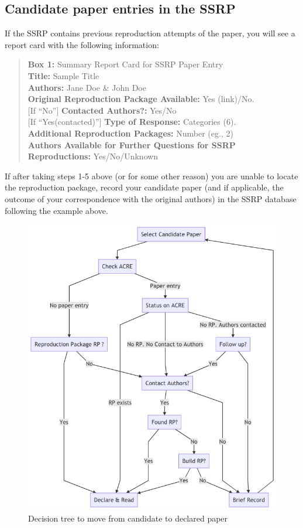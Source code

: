 \documentclass[
  openany]{book}
\begin{document}
\hypertarget{check-acre}{%
\subsection{Candidate paper entries in the SSRP}\label{check-acre}}

If the SSRP contains previous reproduction attempts of the paper, you will see a report card with the following information:

\begin{quote}
\textbf{Box 1:} Summary Report Card for SSRP Paper Entry\\
\textbf{Title:} Sample Title\\
\textbf{Authors:} Jane Doe \& John Doe\\
\textbf{Original Reproduction Package Available:} Yes (link)/No.\\
{[}If ``No''{]} \textbf{Contacted Authors?:} Yes/No\\
{[}If ``Yes(contacted)''{]} \textbf{Type of Response:} Categories (6).\\
\textbf{Additional Reproduction Packages:} Number (eg., 2)\\
\textbf{Authors Available for Further Questions for SSRP Reproductions:} Yes/No/Unknown
\end{quote}

If after taking steps 1-5 above (or for some other reason) you are unable to locate the reproduction package, record your candidate paper (and if applicable, the outcome of your correspondence with the original authors) in the SSRP database following the example above.

\begin{figure}
\includegraphics[width=0.8\linewidth]{candidate-to-declared-paper} \caption{Decision tree to move from candidate to declared paper}\label{fig:candidate-paper-dec-tree}
\end{figure}
\end{document}
